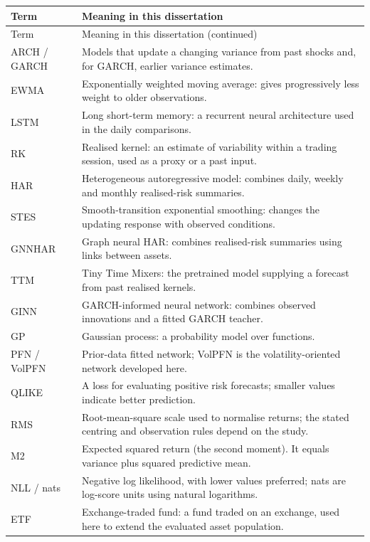 \begingroup
\small
\begin{longtable}{@{}>{\raggedright\arraybackslash}p{2.7cm}>{\raggedright\arraybackslash}p{11.0cm}@{}}
\toprule Term & Meaning in this dissertation \\
\midrule\endfirsthead
\toprule Term & Meaning in this dissertation (continued) \\
\midrule\endhead
ARCH / GARCH & Models that update a changing variance from past shocks and, for GARCH, earlier variance estimates. \\
EWMA & Exponentially weighted moving average: gives progressively less weight to older observations. \\
LSTM & Long short-term memory: a recurrent neural architecture used in the daily comparisons. \\
RK & Realised kernel: an estimate of variability within a trading session, used as a proxy or a past input. \\
HAR & Heterogeneous autoregressive model: combines daily, weekly and monthly realised-risk summaries. \\
STES & Smooth-transition exponential smoothing: changes the updating response with observed conditions. \\
GNNHAR & Graph neural HAR: combines realised-risk summaries using links between assets. \\
TTM & Tiny Time Mixers: the pretrained model supplying a forecast from past realised kernels. \\
GINN & GARCH-informed neural network: combines observed innovations and a fitted GARCH teacher. \\
GP & Gaussian process: a probability model over functions. \\
PFN / VolPFN & Prior-data fitted network; VolPFN is the volatility-oriented network developed here. \\
QLIKE & A loss for evaluating positive risk forecasts; smaller values indicate better prediction. \\
RMS & Root-mean-square scale used to normalise returns; the stated centring and observation rules depend on the study. \\
M2 & Expected squared return (the second moment). It equals variance plus squared predictive mean. \\
NLL / nats & Negative log likelihood, with lower values preferred; nats are log-score units using natural logarithms. \\
ETF & Exchange-traded fund: a fund traded on an exchange, used here to extend the evaluated asset population. \\

\end{longtable}
